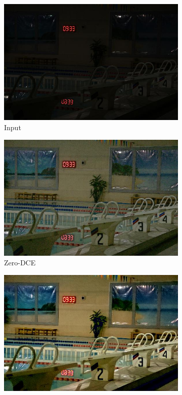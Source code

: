 \documentclass[a4paper, 10pt]{article}
\begin{document}
		\begin{figure}[htb]
			\centering
			\begin{subfigure}{0.19\textwidth}
				\includegraphics[width=\linewidth]{picture/LLIE/Experiment/Input}
				\captionsetup{font=scriptsize}
				\caption{Input}
				\label{fig: Input}
			\end{subfigure}
			\begin{subfigure}{0.19\textwidth}
				\includegraphics[width=\linewidth]{picture/LLIE/Experiment/Zero-DCE}				
				\captionsetup{font=scriptsize}
				\caption{Zero-DCE}
				\label{fig: Zero-DCE}	
			\end{subfigure}
			\begin{subfigure}{0.19\textwidth}
				\includegraphics[width=\linewidth]{picture/LLIE/Experiment/MBLLEN}

\end{subfigure}
\end{figure}
\end{document}
